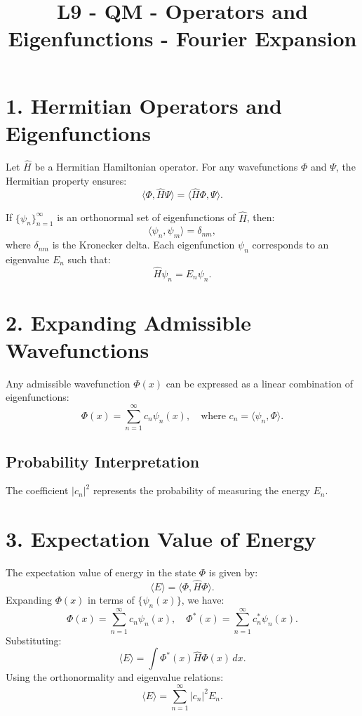 \documentclass[a4paper,12pt]{article}
\begin{document}
\title{\textbf{L9 - QM - Operators and Eigenfunctions - Fourier Expansion }}
\author{}
\date{}
\maketitle

\begin{multicols}{2}

\section*{1. Hermitian Operators and Eigenfunctions}
Let $\hat{H}$ be a Hermitian Hamiltonian operator. For any wavefunctions $\Phi$ and $\Psi$, the Hermitian property ensures:
\[
\langle \Phi, \hat{H} \Psi \rangle = \langle \hat{H} \Phi, \Psi \rangle.
\]

If $\{\psi_n\}_{n=1}^\infty$ is an orthonormal set of eigenfunctions of $\hat{H}$, then:
\[
\langle \psi_n, \psi_m \rangle = \delta_{nm},
\]
where $\delta_{nm}$ is the Kronecker delta. Each eigenfunction $\psi_n$ corresponds to an eigenvalue $E_n$ such that:
\[
\hat{H} \psi_n = E_n \psi_n.
\]

\section*{2. Expanding Admissible Wavefunctions}
Any admissible wavefunction $\Phi(x)$ can be expressed as a linear combination of eigenfunctions:
\[
\Phi(x) = \sum_{n=1}^\infty c_n \psi_n(x), \quad \text{where } c_n = \langle \psi_n, \Phi \rangle.
\]

\subsection*{Probability Interpretation}
The coefficient $|c_n|^2$ represents the probability of measuring the energy $E_n$.

\section*{3. Expectation Value of Energy}
The expectation value of energy in the state $\Phi$ is given by:
\[
\langle E \rangle = \langle \Phi, \hat{H} \Phi \rangle.
\]
Expanding $\Phi(x)$ in terms of $\{\psi_n(x)\}$, we have:
\[
\Phi(x) = \sum_{n=1}^\infty c_n \psi_n(x), \quad \Phi^*(x) = \sum_{n=1}^\infty c_n^* \psi_n(x).
\]
Substituting:
\[
\langle E \rangle = \int \Phi^*(x) \hat{H} \Phi(x) \, dx.
\]
Using the orthonormality and eigenvalue relations:
\[
\langle E \rangle = \sum_{n=1}^\infty |c_n|^2 E_n.
\]


\end{multicols}
\end{document}
